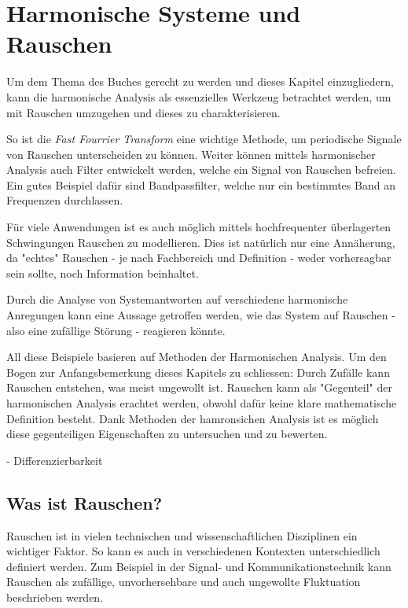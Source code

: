 %
%
%
%


\section{Harmonische Systeme und Rauschen\label{brown:Rauschen}}

Um dem Thema des Buches gerecht zu werden und dieses Kapitel einzugliedern, kann die harmonische Analysis als essenzielles Werkzeug betrachtet werden, um mit Rauschen umzugehen und dieses zu charakterisieren. 

So ist die \textit{Fast Fourrier Transform} eine wichtige Methode, um periodische Signale von Rauschen unterscheiden zu können.
Weiter können mittels harmonischer Analysis auch Filter entwickelt werden, welche ein Signal von Rauschen befreien. Ein gutes Beispiel dafür sind Bandpassfilter, welche nur ein bestimmtes Band an Frequenzen durchlassen.

Für viele Anwendungen ist es auch möglich mittels hochfrequenter überlagerten Schwingungen Rauschen zu modellieren. Dies ist natürlich nur eine Annäherung, da "echtes" Rauschen - je nach Fachbereich und Definition - weder vorhersagbar sein sollte, noch Information beinhaltet. 

Durch die Analyse von Systemantworten auf verschiedene harmonische Anregungen kann eine Aussage getroffen werden, wie das System auf Rauschen - also eine zufällige Störung - reagieren könnte.

All diese Beispiele basieren auf Methoden der Harmonischen Analysis. Um den Bogen zur Anfangsbemerkung dieses Kapitels zu schliessen: Durch Zufälle kann Rauschen entstehen, was meist ungewollt ist. Rauschen kann als "Gegenteil" der harmonischen Analysis erachtet werden, obwohl dafür keine klare mathematische Definition besteht. Dank Methoden der hamronsichen Analysis ist es möglich diese gegenteiligen Eigenschaften zu untersuchen und zu bewerten.

- Differenzierbarkeit



\subsection{Was ist Rauschen?\label{brown:Rauschen:Arten}}
Rauschen ist in vielen technischen und wissenschaftlichen Disziplinen ein wichtiger Faktor. So kann es auch in verschiedenen Kontexten unterschiedlich definiert werden. 
Zum Beispiel in der Signal- und Kommunikationstechnik kann Rauschen als zufällige, unvorhersehbare und auch ungewollte Fluktuation beschrieben werden. 

